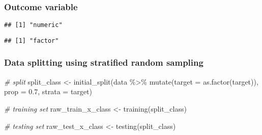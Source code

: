 \documentclass[
]{book}
\newenvironment{Shaded}{\begin{snugshade}}{\end{snugshade}}
\newcommand{\AttributeTok}[1]{\textcolor[rgb]{0.77,0.63,0.00}{#1}}
\newcommand{\CommentTok}[1]{\textcolor[rgb]{0.56,0.35,0.01}{\textit{#1}}}
\newcommand{\FloatTok}[1]{\textcolor[rgb]{0.00,0.00,0.81}{#1}}
\newcommand{\FunctionTok}[1]{\textcolor[rgb]{0.00,0.00,0.00}{#1}}
\newcommand{\NormalTok}[1]{#1}
\newcommand{\OtherTok}[1]{\textcolor[rgb]{0.56,0.35,0.01}{#1}}
\newcommand{\SpecialCharTok}[1]{\textcolor[rgb]{0.00,0.00,0.00}{#1}}
\begin{document}
\hypertarget{outcome-variable-1}{%
\subsubsection{Outcome variable}\label{outcome-variable-1}}

\begin{Shaded}
\end{Shaded}

\begin{verbatim}
## [1] "numeric"
\end{verbatim}

\begin{Shaded}
\end{Shaded}

\begin{verbatim}
## [1] "factor"
\end{verbatim}

\hypertarget{data-splitting-using-stratified-random-sampling}{%
\subsubsection{Data splitting using stratified random sampling}\label{data-splitting-using-stratified-random-sampling}}

\begin{Shaded}
\begin{Highlighting}[]
\CommentTok{\# split }
\NormalTok{split\_class }\OtherTok{\textless{}{-}} \FunctionTok{initial\_split}\NormalTok{(data }\SpecialCharTok{\%\textgreater{}\%}
                             \FunctionTok{mutate}\NormalTok{(}\AttributeTok{target =} \FunctionTok{as.factor}\NormalTok{(target)), }
                             \AttributeTok{prop =} \FloatTok{0.7}\NormalTok{, }
                             \AttributeTok{strata =}\NormalTok{ target)}

\CommentTok{\# training set }
\NormalTok{raw\_train\_x\_class }\OtherTok{\textless{}{-}} \FunctionTok{training}\NormalTok{(split\_class)}

\CommentTok{\# testing set }
\NormalTok{raw\_test\_x\_class }\OtherTok{\textless{}{-}} \FunctionTok{testing}\NormalTok{(split\_class)}
\end{Highlighting}
\end{Shaded}
\end{document}
